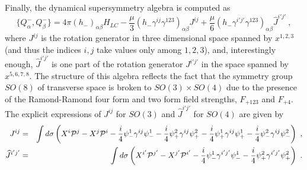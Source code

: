 \documentclass[a4paper,12pt]{article}
\begin{document}
Finally, the dynamical supersymmetry algebra is computed as
\begin{equation}
\{ Q^-_\alpha , Q^-_\beta \} 
  = 4 \pi (h_-)_{\alpha \beta} H_{LC}
     - \frac{\mu}{3}
        (h_- \gamma^{ij} \gamma^{123})_{\alpha \beta} J^{ij}
     + \frac{\mu}{6} (h_- \gamma^{i'j'} \gamma^{123})_{\alpha \beta} 
         \widehat{J}^{i'j'} ~,
\label{d-alg}
\end{equation}
where $J^{ij}$ is the rotation generator in three dimensional space
spanned by $x^{1,2,3}$ (and thus the indices $i,j$ take values only
among $1,2,3$), and, interestingly enough, $\widehat{J}^{i'j'}$ is one
part of the rotation generator $J^{i'j'}$ in the space spanned by
$x^{5,6,7,8}$.  The structure of this algebra reflects the fact that
the symmetry group $SO(8)$ of transverse space is broken to $SO(3)
\times SO(4)$ due to the presence of the Ramond-Ramond four form and
two form field strengths, $F_{+123}$ and $F_{+4}$. The explicit
expressions of $J^{ij}$ for $SO(3)$ and $\widehat{J}^{i'j'}$ for
$SO(4)$ are given by
\begin{eqnarray}
J^{ij} &=& \int d \sigma
  \left(
  X^i {\cal P}^j - X^j {\cal P}^i 
  - \frac{i}{4} \psi^1_- \gamma^{ij} \psi^1_-
  - \frac{i}{4} \psi^2_+ \gamma^{ij} \psi^2_+
 - \frac{i}{4} \psi^1_+ \gamma^{ij} \psi^1_+
  - \frac{i}{4} \psi^2_- \gamma^{ij} \psi^2_-
  \right) ~,
  \nonumber \\
\widehat{J}^{i'j'} &=& \int d \sigma
  \left(
   X^{i'} {\cal P}^{j'} - X^{j'} {\cal P}^{i'} 
  - \frac{i}{4} \psi^1_- \gamma^{i'j'} \psi^1_-
  - \frac{i}{4} \psi^2_+ \gamma^{i'j'} \psi^2_+
  \right) ~.
\end{eqnarray}
\end{document}
